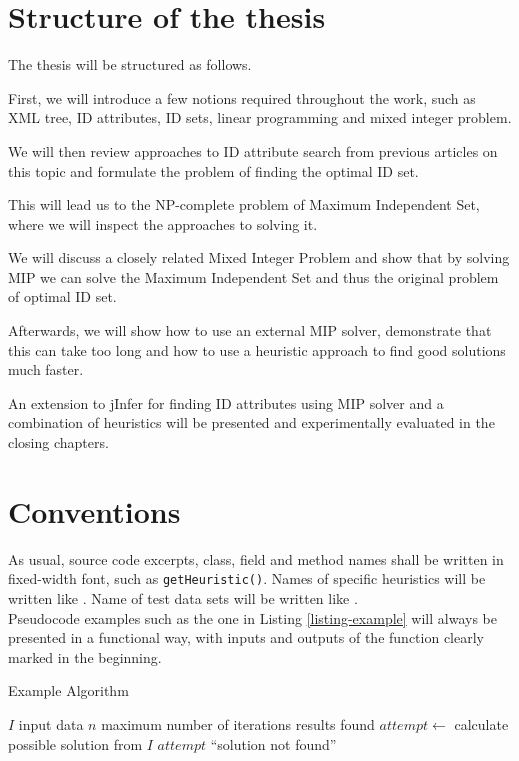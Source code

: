 \section{Structure of the thesis}

The thesis will be structured as follows.

First, we will introduce a few notions required throughout the work, such as XML tree, ID attributes, ID sets, linear programming and mixed integer problem. 

We will then review approaches to ID attribute search from previous articles on this topic and formulate the problem of finding the optimal ID set.

This will lead us to the NP-complete problem of Maximum Independent Set, where we will inspect the approaches to solving it.

We will discuss a closely related Mixed Integer Problem and show that by solving MIP we can solve the Maximum Independent Set and thus the original problem of optimal ID set.

Afterwards, we will show how to use an external MIP solver, demonstrate that this can take too long and how to use a heuristic approach to find good solutions much faster.

An extension to jInfer for finding ID attributes using MIP solver and a combination of heuristics will be presented and experimentally evaluated in the closing chapters.

\section{Conventions}

As usual, source code excerpts, class, field and method names shall be written in fixed-width font, such as \texttt{get\-Heu\-ris\-tic()}. Names of specific heuristics will be written like . Name of test data sets will be written like .\\

Pseudocode examples such as the one in Listing \ref{listing-example} will always be presented in a functional way, with inputs and outputs of the function clearly marked in the beginning.

\begin{algorithm}
\caption{Example Algorithm}
\label{listing-example}
\begin{algorithmic}
\REQUIRE $I$ input data
\REQUIRE $n$ maximum number of iterations
\ENSURE results found
  \STATE {}
  \STATE $attempt \gets $ calculate possible solution from $I$
    \RETURN $attempt$
  \ENDIF
  \RETURN ``solution not found''
\ENDFOR
\end{algorithmic}
\end{algorithm}

